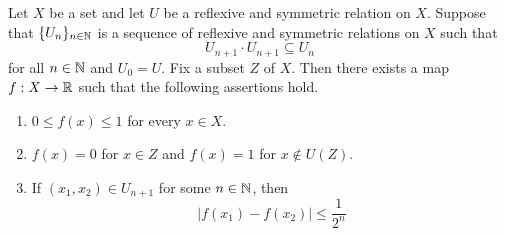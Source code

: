 \documentclass[10pt]{amsart}
\begin{document}
\begin{theorem}\label{theorem:Urysohn_lemma}
	Let $X$ be a set and let $U$ be a reflexive and symmetric relation on $X$. Suppose that $\{U_n\}_{n\in {\mathbb N}}$ is a sequence of reflexive and symmetric relations on $X$ such that
	$$U_{n+1}\cdot U_{n+1} \subseteq U_n$$
	for all $n \in {\mathbb N}$ and $U_0 = U$. Fix a subset $Z$ of $X$. Then there exists a map $f: X\rightarrow {\mathbb R}$ such that the following assertions hold.
	\begin{enumerate}[label=\emph{\textbf{(\arabic*)}}, leftmargin=3.0em]
		\item $0\leq f(x) \leq 1$ for every $x \in X$.
		\item $f(x) = 0$ for $x \in Z$ and $f(x) = 1$ for $x \not \in U(Z)$.
		\item If $(x_1,x_2) \in U_{n+1}$ for some $n \in {\mathbb N}$, then
		      $$|f(x_1) - f(x_2)| \leq \frac{1}{2^n}$$
	\end{enumerate}
\end{theorem}
\end{document}
